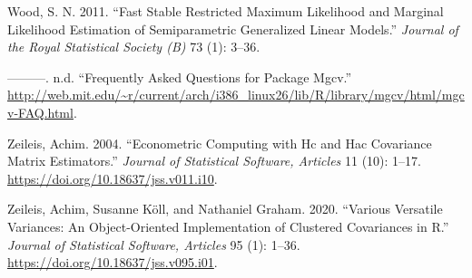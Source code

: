\documentclass{article}
\begin{document}
\leavevmode\hypertarget{ref-mgcv}{}%
Wood, S. N. 2011. ``Fast Stable Restricted Maximum Likelihood and
Marginal Likelihood Estimation of Semiparametric Generalized Linear
Models.'' \emph{Journal of the Royal Statistical Society (B)} 73 (1):
3--36.

\leavevmode\hypertarget{ref-wood}{}%
---------. n.d. ``Frequently Asked Questions for Package Mgcv.''
\url{http://web.mit.edu/~r/current/arch/i386_linux26/lib/R/library/mgcv/html/mgcv-FAQ.html}.

\leavevmode\hypertarget{ref-JSSv011i10}{}%
Zeileis, Achim. 2004. ``Econometric Computing with Hc and Hac Covariance
Matrix Estimators.'' \emph{Journal of Statistical Software, Articles} 11
(10): 1--17. \url{https://doi.org/10.18637/jss.v011.i10}.

\leavevmode\hypertarget{ref-JSSv095i01}{}%
Zeileis, Achim, Susanne Köll, and Nathaniel Graham. 2020. ``Various
Versatile Variances: An Object-Oriented Implementation of Clustered
Covariances in R.'' \emph{Journal of Statistical Software, Articles} 95
(1): 1--36. \url{https://doi.org/10.18637/jss.v095.i01}.



\end{document}
